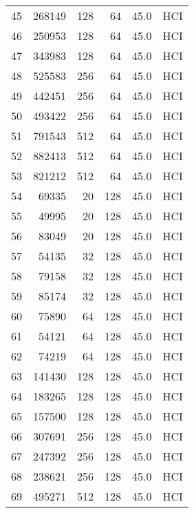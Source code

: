 \begin{longtable}{lrrrrl}
45  &    268149 &        128 &        64 &           45.0 &  HCI \\
46  &    250953 &        128 &        64 &           45.0 &  HCI \\
47  &    343983 &        128 &        64 &           45.0 &  HCI \\
48  &    525583 &        256 &        64 &           45.0 &  HCI \\
49  &    442451 &        256 &        64 &           45.0 &  HCI \\
50  &    493422 &        256 &        64 &           45.0 &  HCI \\
51  &    791543 &        512 &        64 &           45.0 &  HCI \\
52  &    882413 &        512 &        64 &           45.0 &  HCI \\
53  &    821212 &        512 &        64 &           45.0 &  HCI \\
54  &     69335 &         20 &       128 &           45.0 &  HCI \\
55  &     49995 &         20 &       128 &           45.0 &  HCI \\
56  &     83049 &         20 &       128 &           45.0 &  HCI \\
57  &     54135 &         32 &       128 &           45.0 &  HCI \\
58  &     79158 &         32 &       128 &           45.0 &  HCI \\
59  &     85174 &         32 &       128 &           45.0 &  HCI \\
60  &     75890 &         64 &       128 &           45.0 &  HCI \\
61  &     54121 &         64 &       128 &           45.0 &  HCI \\
62  &     74219 &         64 &       128 &           45.0 &  HCI \\
63  &    141430 &        128 &       128 &           45.0 &  HCI \\
64  &    183265 &        128 &       128 &           45.0 &  HCI \\
65  &    157500 &        128 &       128 &           45.0 &  HCI \\
66  &    307691 &        256 &       128 &           45.0 &  HCI \\
67  &    247392 &        256 &       128 &           45.0 &  HCI \\
68  &    238621 &        256 &       128 &           45.0 &  HCI \\
69  &    495271 &        512 &       128 &           45.0 &  HCI \\

\end{longtable}
